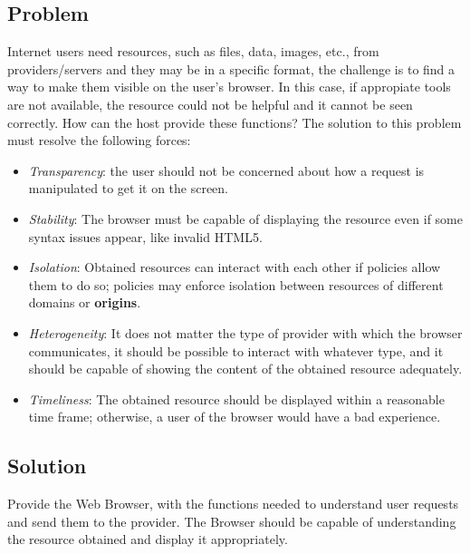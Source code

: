 \documentclass{sig-alternate-05-2015}
\begin{document}
  \subsection*{Problem}
  Internet users need resources, such as files, data, images, etc., from providers/servers and they may be in a specific format, the challenge is to find a way to make them visible on the user's browser. In this case, if appropiate tools are not available, the resource could not be helpful and it cannot be seen correctly. How can the host provide these functions? The solution to this problem must resolve the following forces:
  \begin{itemize}
    \item \textit{Transparency}: the user should not be concerned about how a request is manipulated to get it on the screen.
    \item \textit{Stability}: The browser must be capable of displaying the resource even if some syntax issues appear, like invalid HTML5.
    \item \textit{Isolation}: Obtained resources can interact with each other if policies allow them to do so; policies may enforce isolation between resources of different domains or \textbf{origins}.
    \item \textit{Heterogeneity}: It does not matter the type of provider with which the browser communicates, it should be possible to interact with whatever type, and it should be capable of showing the content of the obtained resource adequately.
    \item \textit{Timeliness}: The obtained resource should be displayed within a reasonable time frame; otherwise, a user of the browser would have a bad experience.
  \end{itemize}

  \subsection*{Solution}
  Provide the Web Browser, with the functions needed to understand user requests and send them to the provider. The Browser should be capable of understanding the resource obtained and display it appropriately. 
\end{document}

